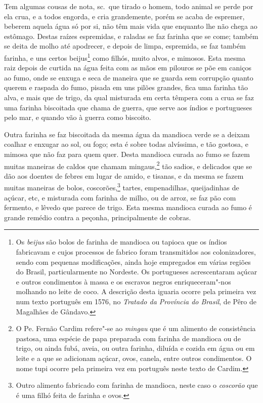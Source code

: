  Tem algumas cousas de nota, sc.~que tirado o homem, todo animal se
perde por ela crua, e a todos engorda, e cria grandemente, porém se
acaba de espremer, beberem aquela água só por si, não têm mais vida que
enquanto lhe não chega ao estômago. Destas raízes espremidas, e raladas
se faz farinha que se come; também se deita de molho até apodrecer, e
depois de limpa, espremida, se faz também farinha, e uns certos 
beijus\footnote{ Os \textit{beijus} são bolos de farinha de mandioca ou
tapioca que os índios fabricavam e cujos processos de fabrico foram
transmitidos aos colonizadores, sendo com pequenas modificações, ainda
hoje empregados em várias regiões do Brasil, particularmente no
Nordeste. Os portugueses acrescentaram açúcar e outros condimentos à
massa e os escravos negros enriqueceram"-nos molhando no leite de coco.
A descrição desta iguaria ocorre pela primeira vez num texto português
em 1576, no \textit{Tratado da Província do Brasil}, de Pêro de Magalhães de 
Gândavo.} como filhós, muito alvos, e mimosos. Esta mesma raiz depois
de curtida na água feita com as mãos em pilouros se põe em caniços ao
fumo, onde se enxuga e seca de maneira que se guarda sem corrupção
quanto querem e raspada do fumo, pisada em uns pilões grandes, fica uma
farinha tão alva, e mais que de trigo, da qual misturada em certa
têmpera com a crua se faz uma farinha biscoitada que chama de guerra,
que serve aos índios e portugueses pelo mar, e quando vão à guerra como biscoito. 

 Outra farinha se faz biscoitada da mesma água da mandioca verde se a 
deixam coalhar e enxugar ao sol, ou fogo; esta é sobre todas alvíssima,
e tão gostosa, e mimosa que não faz para quem quer. Desta mandioca
curada ao fumo se fazem muitas maneiras de caldos que chamam
mingaus,\footnote{ O Pe. Fernão Cardim refere"-se ao \textit{mingau} que
é um alimento de consistência pastosa, uma espécie de papa preparada
com farinha de mandioca ou de trigo, ou ainda fubá, aveia, ou outra
farinha, diluída e cozida em água ou em leite e a que se adicionam
açúcar, ovos, canela, entre outros condimentos. O nome tupi ocorre pela
primeira vez em português neste texto de Cardim.} tão sadios, e
delicados que se dão aos doentes de febres em lugar de amido, e
tisanas, e da mesma se fazem muitas maneiras de bolos, 
coscorões,\footnote{ Outro alimento fabricado com farinha de mandioca, neste caso
o \textit{coscorão} que é uma filhó feita de farinha e ovos.} tartes,
empenadilhas, queijadinhas de açúcar, etc, e misturada com farinha de
milho, ou de arroz, se faz pão com fermento, e lêvedo que parece de
trigo. Esta mesma mandioca curada ao fumo é grande remédio contra a
peçonha, principalmente de cobras. 

